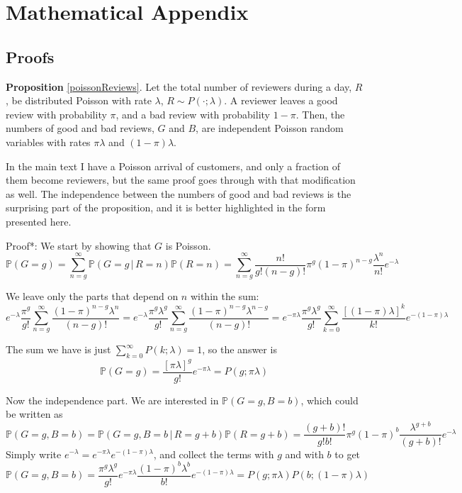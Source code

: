 \documentclass[
  12pt,
  pagebackref]{article}
\newcommand{\PP}[1]{\mathbb{P}\left(#1\right)}
\newcommand{\CP}[2]{\mathbb{P}\left(#1 \,| \, #2 \right)}
\begin{document}
\newpage

\hypertarget{mathematical-appendix}{%
\section{Mathematical Appendix}\label{mathematical-appendix}}

\hypertarget{proofs}{%
\subsection{Proofs}\label{proofs}}

\textbf{Proposition} \ref{poissonReviews}. Let the total number of
reviewers during a day, \(R\), be distributed Poisson with rate
\(\lambda\), \(R\sim P(\cdot; \lambda)\). A reviewer leaves a good
review with probability \(\pi\), and a bad review with probability
\(1-\pi\). Then, the numbers of good and bad reviews, \(G\) and \(B\),
are independent Poisson random variables with rates \(\pi\lambda\) and
\((1-\pi)\lambda\).

In the main text I have a Poisson arrival of customers, and only a
fraction of them become reviewers, but the same proof goes through with
that modification as well. The independence between the numbers of good
and bad reviews is the surprising part of the proposition, and it is
better highlighted in the form presented here.

\vspace{1em}

\noindent *Proof*: We start by showing that \(G\) is Poisson. \[
\PP{G=g} = \sum_{n=g}^{\infty}\CP{G = g}{R=n}\PP{R = n} 
=
\sum_{n = g}^{\infty}
\frac{n!}{g!(n-g)!}
\pi^g (1-\pi)^{n-g}
\frac{\lambda^n}{n!} e^{-\lambda}
\]

\noindent We leave only the parts that depend on \(n\) within the sum:
\[
e^{-\lambda}\frac{\pi^g}{g!}\sum_{n = g}^{\infty}
\frac{(1-\pi)^{n-g} \lambda^n}{(n-g)!}
=
e^{-\lambda}\frac{\pi^g\lambda^g}{g!}\sum_{n = g}^{\infty}
\frac{(1-\pi)^{n-g} \lambda^{n-g} }{(n-g)!}
=
e^{-\pi\lambda}\frac{\pi^g\lambda^g}{g!}\sum_{k=0}^{\infty}
\frac{[(1-\pi)\lambda]^{k} }{k!}e^{-(1-\pi)\lambda}
\]

\noindent The sum we have is just
\(\sum_{k=0}^{\infty} P(k; \lambda) = 1\), so the answer is \[
\PP{G=g} = \frac{[\pi\lambda]^g}{g!}e^{-\pi\lambda} = P(g; \pi\lambda)
\]

Now the independence part. We are interested in \(\PP{G=g, B=b}\), which
could be written as \[\PP{G=g, B=b} = \CP{G=g, B=b}{R=g+b}\PP{R=g+b} = 
\frac{(g+b)!}{g!b!}
\pi^g (1-\pi)^b
\frac{\lambda^{g+b}}{(g+b)!} e^{-\lambda}
\] Simply write \(e^{-\lambda} = e^{-\pi\lambda}e^{-(1-\pi)\lambda}\),
and collect the terms with \(g\) and with \(b\) to get \[
\PP{G=g, B=b} = 
\frac{\pi^g \lambda^g}{g!}e^{-\pi\lambda}
\frac{(1-\pi)^b\lambda^b}{b!}e^{-(1-\pi)\lambda}
=
P(g; \pi \lambda) P(b; (1-\pi)\lambda)\]
\end{document}
